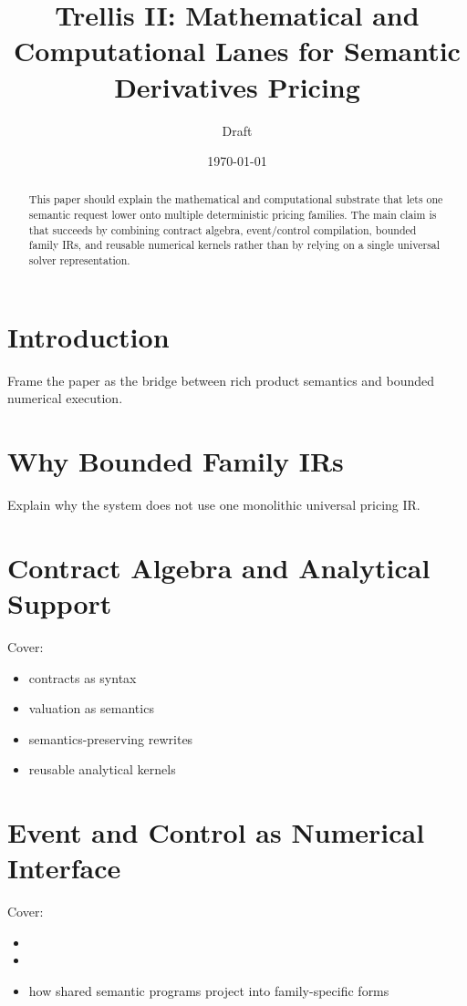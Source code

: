 \documentclass[11pt]{article}
\title{Trellis II: Mathematical and Computational Lanes for Semantic Derivatives Pricing}
\author{Draft}
\date{\today}
\begin{document}
\maketitle

\begin{abstract}
This paper should explain the mathematical and computational substrate that
lets one semantic request lower onto multiple deterministic pricing families.
The main claim is that \trellis{} succeeds by combining contract algebra,
event/control compilation, bounded family IRs, and reusable numerical kernels
rather than by relying on a single universal solver representation.
\end{abstract}

\tableofcontents

\section{Introduction}

Frame the paper as the bridge between rich product semantics and bounded
numerical execution.

\section{Why Bounded Family IRs}

Explain why the system does not use one monolithic universal pricing IR.

\section{Contract Algebra and Analytical Support}

Cover:
\begin{itemize}
    \item contracts as syntax
    \item valuation as semantics
    \item semantics-preserving rewrites
    \item reusable analytical kernels
\end{itemize}

\section{Event and Control as Numerical Interface}

Cover:
\begin{itemize}
    \item \eventprogramir{}
    \item \controlprogramir{}
    \item how shared semantic programs project into family-specific forms
\end{itemize}
\end{document}
